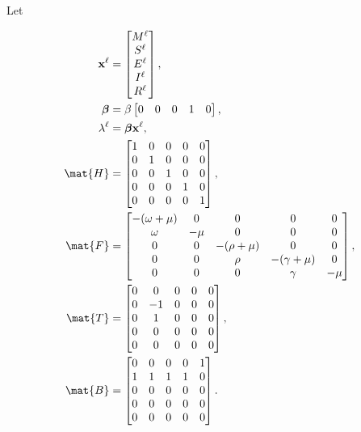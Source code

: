 \documentclass{jpmarticle}
\renewcommand{\vec}[1]{\boldsymbol{\mathrm{#1}}}
\let\subequationsorig\subequations%
\let\endsubequationsorig\endsubequations%
\renewenvironment{subequations}{
  \subequationsorig
  \renewcommand{\theequation}{\theparentequation.\arabic{equation}}
}{
  \endsubequationsorig
}
\begin{document}
Let
\begin{subequations}
  \begin{align}
    \vec{x}^{\ell} &=
    \begin{bmatrix}
      M^{\ell} \\ S^{\ell} \\ E^{\ell} \\ I^{\ell} \\ R^{\ell}
    \end{bmatrix},
    \\
    \vec{\beta} &=
    \beta
    \begin{bmatrix}
      0 & 0 & 0 & 1 & 0
    \end{bmatrix},
    \\
    \lambda^{\ell} &=
    \vec{\beta} \vec{x}^{\ell},
    \\
    \mat{H} &=
    \begin{bmatrix}
      1 & 0 & 0 & 0 & 0 \\
      0 & 1 & 0 & 0 & 0 \\
      0 & 0 & 1 & 0 & 0 \\
      0 & 0 & 0 & 1 & 0 \\
      0 & 0 & 0 & 0 & 1
    \end{bmatrix},
    \\
    \mat{F} &=
    \begin{bmatrix}
      - (\omega + \mu) & 0 & 0 & 0 & 0 \\
      \omega & - \mu & 0 & 0 & 0 \\
      0 & 0 & - (\rho + \mu) & 0 & 0 \\
      0 & 0 & \rho & - (\gamma + \mu) & 0 \\
      0 & 0 & 0 & \gamma & - \mu
    \end{bmatrix},
    \\
    \mat{T} &=
    \begin{bmatrix}
      0 & 0 & 0 & 0 & 0 \\
      0 & -1 & 0 & 0 & 0 \\
      0 & 1 & 0 & 0 & 0 \\
      0 & 0 & 0 & 0 & 0 \\
      0 & 0 & 0 & 0 & 0
    \end{bmatrix},
    \\
    \mat{B} &=
    \begin{bmatrix}
      0 & 0 & 0 & 0 & 1 \\
      1 & 1 & 1 & 1 & 0 \\
      0 & 0 & 0 & 0 & 0 \\
      0 & 0 & 0 & 0 & 0 \\
      0 & 0 & 0 & 0 & 0
    \end{bmatrix}.
  \end{align}
\end{subequations}
\end{document}
